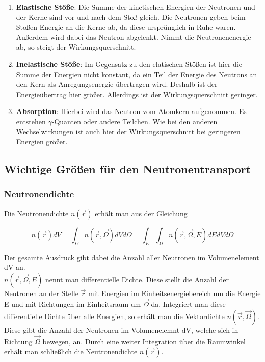 \documentclass[a4paper,titlepage]{scrartcl}
\numberwithin{equation}{section}
\begin{document}
\begin{enumerate}
\item \textbf{Elastische Stöße}: Die Summe der kinetischen Energien der Neutronen und der Kerne sind vor und nach dem Stoß gleich. Die Neutronen geben beim Stoßen Energie an die Kerne ab, da diese ursprünglich in Ruhe waren. Außerdem wird dabei das Neutron abgelenkt. Nimmt die Neutronenenergie ab, so steigt der Wirkungsquerschnitt.
\item \textbf{Inelastische Stöße}: Im Gegensatz zu den elatischen Stößen ist hier die Summe der Energien nicht konstant, da ein Teil der Energie des Neutrons an den Kern als Anregungsenergie übertragen wird. Deshalb ist der Energieübertrag hier größer. Allerdings ist der Wirkungsquerschnitt geringer.
\item \textbf{Absorption}: Hierbei wird das Neutron vom Atomkern aufgenommen. Es entstehen $\gamma$-Quanten oder andere Teilchen. Wie bei den anderen Wechselwirkungen ist auch hier der Wirkungsquerschnitt bei geringeren Energien größer.
\end{enumerate}
\subsection{Wichtige Größen für den Neutronentransport}
\subsubsection{Neutronendichte}
Die Neutronendichte $n(\vec{r})$ erhält man aus der Gleichung

\begin{equation}
n(\vec{r})dV = \int_{\Omega}n(\vec{r},\vec{\Omega})dV d\Omega = \int_E \int_{\Omega}n(\vec{r},\vec{\Omega},E)dE dV d\Omega
\end{equation}

Der gesamte Ausdruck gibt dabei die Anzahl aller Neutronen im Volumenelement dV an.\\
$ n(\vec{r},\vec{\Omega},E)$ nennt man  differentielle Dichte. Diese stellt die Anzahl der Neutronen an der Stelle $\vec{r}$ mit Energien im Einheitsenergiebereich um die Energie E und mit Richtungen im Einheitsraum um $\vec{\Omega}$ da. Integriert man diese differentielle Dichte über alle Energien, so erhält man die Vektordichte $n(\vec{r},\vec{\Omega})$. Diese gibt die Anzahl der Neutronen im Volumenelemnt dV, welche sich in Richtung $\vec{\Omega}$ bewegen, an. Durch eine weiter Integration über die Raumwinkel erhält man schließlich die Neutronendichte $n(\vec{r})$.
\end{document}
